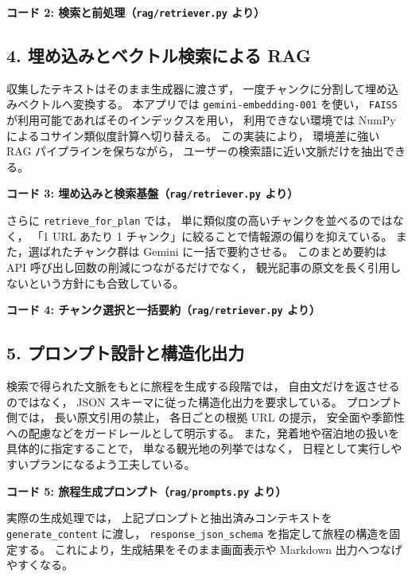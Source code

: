 \documentclass[a4paper,11pt]{ltjsarticle}
\begin{document}
\noindent\textbf{コード 2: 検索と前処理（\texttt{rag/retriever.py} より）}

\subsection*{4. 埋め込みとベクトル検索による RAG}
収集したテキストはそのまま生成器に渡さず，
一度チャンクに分割して埋め込みベクトルへ変換する。
本アプリでは \texttt{gemini-embedding-001} を使い，
\texttt{FAISS} が利用可能であればそのインデックスを用い，
利用できない環境では NumPy によるコサイン類似度計算へ切り替える。
この実装により，
環境差に強い RAG パイプラインを保ちながら，
ユーザーの検索語に近い文脈だけを抽出できる。

\noindent\textbf{コード 3: 埋め込みと検索基盤（\texttt{rag/retriever.py} より）}

さらに \texttt{retrieve\_for\_plan} では，
単に類似度の高いチャンクを並べるのではなく，
「1 URL あたり 1 チャンク」に絞ることで情報源の偏りを抑えている。
また，選ばれたチャンク群は Gemini に一括で要約させる。
このまとめ要約は API 呼び出し回数の削減につながるだけでなく，
観光記事の原文を長く引用しないという方針にも合致している。

\noindent\textbf{コード 4: チャンク選択と一括要約（\texttt{rag/retriever.py} より）}

\subsection*{5. プロンプト設計と構造化出力}
検索で得られた文脈をもとに旅程を生成する段階では，
自由文だけを返させるのではなく，
JSON スキーマに従った構造化出力を要求している。
プロンプト側では，
長い原文引用の禁止，
各日ごとの根拠 URL の提示，
安全面や季節性への配慮などをガードレールとして明示する。
また，発着地や宿泊地の扱いを具体的に指定することで，
単なる観光地の列挙ではなく，
日程として実行しやすいプランになるよう工夫している。

\noindent\textbf{コード 5: 旅程生成プロンプト（\texttt{rag/prompts.py} より）}

実際の生成処理では，
上記プロンプトと抽出済みコンテキストを \texttt{generate\_content} に渡し，
\texttt{response\_json\_schema} を指定して旅程の構造を固定する。
これにより，生成結果をそのまま画面表示や Markdown 出力へつなげやすくなる。
\end{document}
